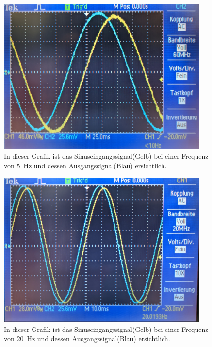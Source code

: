 \documentclass[12pt,english,ngerman]{scrartcl}
\begin{document}
\begin{figure}[H]
  \centering
    \includegraphics[width=0.95\textwidth]{./figures/integrator/5hz.jpg}
    \caption{In dieser Grafik ist das Sinuseingangssignal(Gelb) bei einer Frequenz von
    \SI{5}{\Hz} und dessen Ausgangssignal(Blau) ersichtlich.}
  \label{fig:mess_integrator_5hz}
\end{figure}

\begin{figure}[H]
  \centering
    \includegraphics[width=0.95\textwidth]{./figures/integrator/20hz.jpg}
    \caption{In dieser Grafik ist das Sinuseingangssignal(Gelb) bei einer Frequenz von
    \SI{20}{\Hz} und dessen Ausgangssignal(Blau) ersichtlich.}
  \label{fig:mess_integrator_20hz}
\end{figure}
\end{document}
